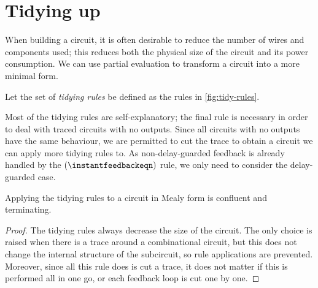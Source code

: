 \section{Tidying up}

When building a circuit, it is often desirable to reduce the number of wires
and components used; this reduces both the physical size of the circuit and its
power consumption.
We can use partial evaluation to transform a circuit into a more minimal form.

\begin{definition}
    Let the set of \emph{tidying rules} be defined as the rules in
    \cref{fig:tidy-rules}.
\end{definition}

Most of the tidying rules are self-explanatory; the final rule is necessary in
order to deal with traced circuits with no outputs.
Since all circuits with no outputs have the same behaviour, we are permitted to
cut the trace to obtain a circuit we can apply more tidying rules to.
As non-delay-guarded feedback is already handled by the
\((\instantfeedbackeqn)\) rule, we only need to consider the delay-guarded case.



\begin{proposition}
    Applying the tidying rules to a circuit in Mealy form is confluent and
    terminating.
\end{proposition}
\begin{proof}
    The tidying rules always decrease the size of the circuit.
    The only choice is raised when there is a trace around a combinational
    circuit, but this does not change the internal structure of the subcircuit,
    so rule applications are prevented.
    Moreover, since all this rule does is cut a trace, it does not matter if
    this is performed all in one go, or each feedback loop is cut one by one.
\end{proof}